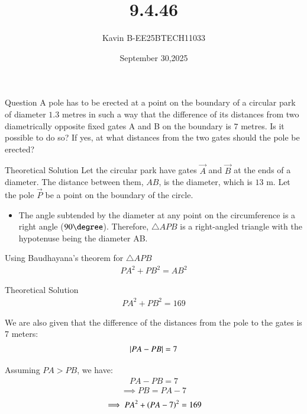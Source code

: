 \documentclass{beamer}
\begin{document}
\title 
{9.4.46}
\date{September 30,2025}


\author 
{Kavin B-EE25BTECH11033}






\frame{\titlepage}
\begin{frame}{Question}
A pole has to be erected at a point on the boundary of a circular park of diameter $1.3$ metres in such a way that the difference of its distances from two diametrically opposite fixed gates A and B on the boundary is $7$ metres. Is it possible to do so? If yes, at what distances from the two gates should the pole be erected?\\
\bigskip
\end{frame}



\begin{frame}{Theoretical Solution}
Let the circular park have gates $\vec{A}$ and $\vec{B}$ at the ends of a diameter. The distance between them, $AB$, is the diameter, which is $13$ m. Let the pole $\vec{P}$ be a point on the boundary of the circle.

\begin{itemize}
    \item The angle subtended by the diameter at any point on the circumference is a right angle ($90\degree$). Therefore, $\triangle APB$ is a right-angled triangle with the hypotenuse being the diameter AB.
\end{itemize}


Using Baudhayana's theorem for $\triangle APB$
\begin{align*}
 PA^2 + PB^2 = AB^2     
\end{align*}
\end{frame}

\begin{frame}{Theoretical Solution}
\begin{align}
PA^2 + PB^2 = 169
\end{align}

We are also given that the difference of the distances from the pole to the gates is 7 meters:
\begin{align}
\left\vert PA - PB\right\vert = 7    
\end{align} 

Assuming $PA > PB$, we have:
\begin{align}
PA - PB = 7
\end{align}
\begin{align}
\implies PB = PA - 7
\end{align}
\begin{align}
\implies PA^2 + \left(PA - 7\right)^2 = 169
\end{align}
\end{frame}
\end{document}
